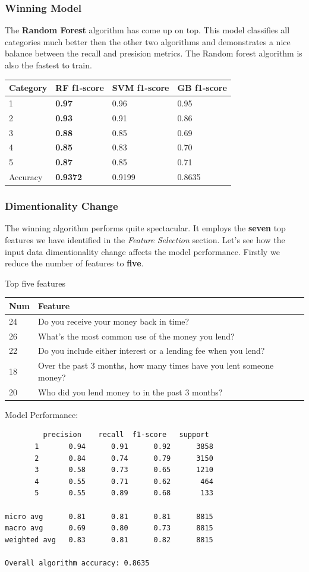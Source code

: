 \hypertarget{winning-model}{%
\subsubsection{Winning Model}\label{winning-model}}

The \textbf{Random Forest} algorithm has come up on top. This model
classifies all categories much better then the other two algorithms and
demonstrates a nice balance between the recall and presision metrics.
The Random forest algorithm is also the fastest to train.

\begin{longtable}[]{@{}llll@{}}
\toprule
Category & \textbf{RF f1-score} & SVM f1-score & GB
f1-score\tabularnewline
\midrule
\endhead
1 & \textbf{0.97} & 0.96 & 0.95\tabularnewline
2 & \textbf{0.93} & 0.91 & 0.86\tabularnewline
3 & \textbf{0.88} & 0.85 & 0.69\tabularnewline
4 & \textbf{0.85} & 0.83 & 0.70\tabularnewline
5 & \textbf{0.87} & 0.85 & 0.71\tabularnewline
Accuracy & \textbf{0.9372} & 0.9199 & 0.8635\tabularnewline
\bottomrule
\end{longtable}

\hypertarget{dimentionality-change}{%
\subsubsection{Dimentionality Change}\label{dimentionality-change}}

The winning algorithm performs quite spectacular. It employs the
\textbf{seven} top features we have identified in the \emph{Feature
Selection} section. Let's see how the input data dimentionality change
affects the model performance. Firstly we reduce the number of features
to \textbf{five}.

Top five features

\begin{longtable}[]{@{}ll@{}}
\toprule
Num & Feature\tabularnewline
\midrule
\endhead
24 & Do you receive your money back in time?\tabularnewline
26 & What's the most common use of the money you lend?\tabularnewline
22 & Do you include either interest or a lending fee when you
lend?\tabularnewline
18 & Over the past 3 months, how many times have you lent someone
money?\tabularnewline
20 & Who did you lend money to in the past 3 months?\tabularnewline
\bottomrule
\end{longtable}

Model Performance:

\begin{verbatim}
         precision    recall  f1-score   support
       1       0.94      0.91      0.92      3858
       2       0.84      0.74      0.79      3150
       3       0.58      0.73      0.65      1210
       4       0.55      0.71      0.62       464
       5       0.55      0.89      0.68       133

micro avg      0.81      0.81      0.81      8815
macro avg      0.69      0.80      0.73      8815
weighted avg   0.83      0.81      0.82      8815

Overall algorithm accuracy: 0.8635
\end{verbatim}

